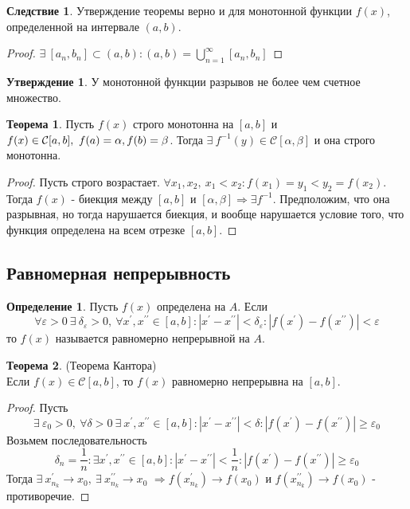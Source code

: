 \documentclass[a4paper, 12pt]{article}
\renewcommand{\epsilon}{\varepsilon}
\theoremstyle{definition}
\newtheorem*{definition}{Определение}
\newtheorem*{theorem}{Теорема}
\newtheorem*{consequense}{Следствие}
\newtheorem*{statement}{Утверждение}
\begin{document}
        \begin{consequense}
            Утверждение теоремы верно и для монотонной функции $f(x)$, определенной на интервале $(a,b)$.
        \end{consequense} 
        \begin{proof}
            $\exists\ [a_n,b_n]\subset (a,b): (a,b)=\bigcup\limits_{n=1}^{\infty}[a_n,b_n]$
        \end{proof}
        \begin{statement}
            У монотонной функции разрывов не более чем счетное множество.
        \end{statement} 
        \begin{theorem}
            Пусть $f(x)$ строго монотонна на $[a,b]$ и $f(x)\in\mathcal{C}[a,b],\ f(a)=\alpha,\\
            f(b)=\beta$. Тогда $\exists\ f^{-1}(y)\in\mathcal{C}[\alpha,\beta]$ и она строго монотонна. 
        \end{theorem} 
        \begin{proof}
            Пусть строго возрастает. $\forall x_1,x_2,\ x_1<x_2: f(x_1)=y_1<y_2=f(x_2)$. Тогда $f(x)$ - биекция между $[a,b]$ и $[\alpha,\beta] \Rightarrow \exists f^{-1}$. Предположим, что она разрывная, но тогда нарушается биекция, и вообще нарушается условие того, что функция определена на всем отрезке $[a,b]$.
        \end{proof} 
    \subsection{Равномерная непрерывность}
        \begin{definition}
            Пусть $f(x)$ определена на $A$. Если 
            \[\forall \epsilon>0\ \exists\ \delta_{\epsilon}>0,\ \forall x^{\prime}, x^{\prime\prime}\in [a,b]: |x^{\prime}-x^{\prime\prime}|<\delta_{\epsilon}: |f(x^{\prime})-f(x^{\prime\prime})|<\epsilon\] 
            то $f(x)$ называется равномерно непрерывной на $A$.
        \end{definition} 
        \begin{theorem} (Теорема Кантора)\\
            Если $f(x)\in \mathcal{C}[a,b]$, то $f(x)$ равномерно непрерывна на $[a,b]$.
        \end{theorem} 
        \begin{proof}
            Пусть 
            \[\exists\ \epsilon_0>0,\ \forall \delta>0\ \exists\ x^{\prime}, x^{\prime\prime}\in [a,b]: |x^{\prime}-x^{\prime\prime}|<\delta: |f(x^{\prime})-f(x^{\prime\prime})|\geq \epsilon_0\] 
            Возьмем последовательность 
            \[\delta_n=\frac{1}{n}: \exists x^{\prime},x^{\prime\prime}\in [a,b]: |x^{\prime}-x^{\prime\prime}|<\frac{1}{n}: |f(x^{\prime})-f(x^{\prime\prime})|\geq \epsilon_0\] 
            Тогда $\exists\ x_{n_k}^{\prime}\to x_0,\ \exists\ x_{n_k}^{\prime\prime}\to x_0$ $\Rightarrow f(x_{n_k}^{\prime})\to f(x_0)$ и $f(x_{n_k}^{\prime\prime})\to f(x_0)$ - противоречие.
        \end{proof}
\end{document}
